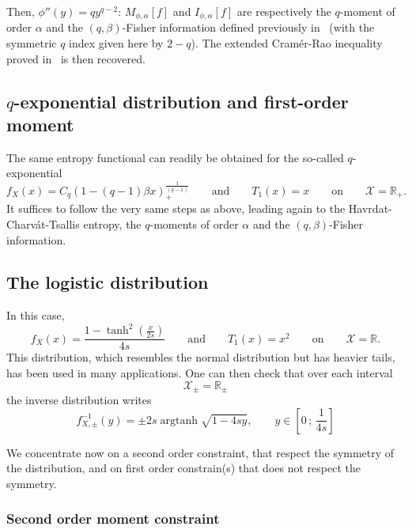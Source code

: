 \documentclass[english,sort&compress]{elsarticle}
\theoremstyle{definition}
\theoremstyle{plain}
\theoremstyle{plain}
\def\Rset{\mathbb{R}}
\def\X{\mathcal{X}}
\def\argtanh{\operatorname{argtanh}}
\begin{document}
Then, $\phi''(y) = q y^{q-2}$: $M_{\phi,\alpha}[f]$ and $I_{\phi,\alpha}[f]$ are
respectively  the  $q$-moment  of  order  $\alpha$  and  the  $(q,\beta)$-Fisher
information   defined  previously   in~\cite{Ber12:06_1,Ber12:06_2}   (with  the
symmetric $q$ index  given here by $2-q$). The  extended Cram\'er-Rao inequality
proved in~\cite{Ber12:06_2} is then recovered.



\subsection{$q$-exponential distribution and first-order moment}
\label{subsec:qExponentialFirstOrder}

The  same  entropy  functional  can   readily  be  obtained  for  the  so-called
$q$-exponential
% 
\[
f_X(x)  =  C_q \left(  1  -  (q-1)  \beta x  \right)_+^{\frac{1}{(q-1)}}  \qquad
\mbox{and} \qquad T_1(x) = x \qquad \mbox{on} \qquad \X = \Rset_+.
\]
%
It  suffices to  follow  the very  same steps  as  above, leading  again to  the
Havrdat-Charv\'at-Tsallis  entropy, the  $q$-moments of  order $\alpha$  and the
$(q,\beta)$-Fisher information.



\subsection{The logistic distribution}
\label{subsec:Logistic}

In this case, 
%
\[
f_X(x)  = \frac{1  -  \tanh^2\!\left(\frac{x}{2s}\right)}{4s} \qquad  \mbox{and}
\qquad T_1(x) = x^2 \qquad \mbox{on} \qquad \X = \Rset.
\]
This  distribution, which  resembles  the normal  distribution  but has  heavier
tails, has  been used in  many applications. One  can then check that  over each
interval
%
\[
\X_\pm = \Rset_\pm
\]
%
the inverse distribution writes 
%
\[
f_{X,\pm}^{-1}(y) = \pm 2 s \argtanh \sqrt{1-4sy}, \qquad y \in \left[ 0 \, ; \,
  \frac{1}{4s} \right]
\]

We concentrate  now on a second  order constraint, that respect  the symmetry of
the  distribution, and on  first order  constrain(s) that  does not  respect the
symmetry.



\subsubsection{Second order moment constraint}
\end{document}
